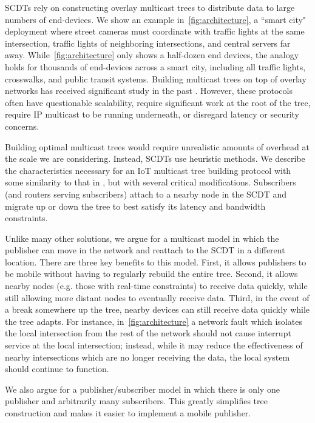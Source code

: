 SCDTs rely on constructing overlay multicast trees to distribute data to
large numbers of end-devices.  We show an example in~\autoref{fig:architecture}, a 
``smart city" \cite{smart-city}
deployment where street cameras must coordinate with traffic lights at the same
intersection, traffic lights of neighboring intersections, and central servers
far away.  While~\autoref{fig:architecture} only shows a half-dozen end devices, 
the analogy holds
for thousands of end-devices across a smart city, including all traffic lights,
crosswalks, and public transit systems.  Building multicast trees on top of
overlay networks has received significant study in the past \cite{overcast,
	scribe, RFC3208}.  However, these protocols often have questionable scalability, require significant work at the root of the tree, require IP multicast to be running underneath, or disregard latency or security concerns.

Building optimal multicast trees would require unrealistic amounts of overhead
at the scale we are considering.  Instead, SCDTs use heuristic methods.  We describe the characteristics necessary for an IoT
multicast tree building protocol with some similarity to that in
\cite{overcast}, but with several critical modifications.  Subscribers (and
routers serving subscribers) attach to a nearby node in the SCDT and
migrate up or down the tree to best satisfy its latency and bandwidth
constraints.

Unlike many other solutions, we argue for a multicast model in which the
publisher can move in the network and reattach to the SCDT in a different
location.  There are three key benefits to this model.  First, it allows
publishers to be mobile without having to regularly rebuild the entire tree.
Second, it allows nearby nodes (e.g. those with real-time constraints) to
receive data quickly, while still allowing more distant nodes to eventually
receive data.  Third, in the event of a break somewhere up the tree, nearby
devices can still receive data quickly while the tree adapts.  For instance, 
in~\autoref{fig:architecture} a network fault which isolates the local 
intersection from the rest of
the network should not cause interrupt service at the local intersection; instead, while
it may reduce the effectiveness of nearby intersections which are no longer
receiving the data, the local system should continue to function.

We also argue for a publisher/subscriber model in which there is only one
publisher and arbitrarily many subscribers. This greatly simplifies tree
construction and makes it easier to implement a mobile publisher.

